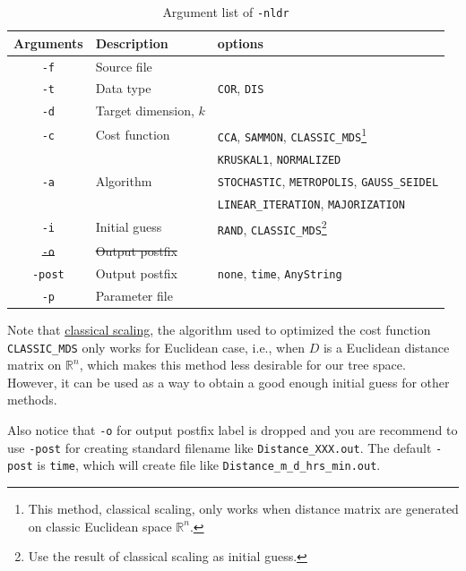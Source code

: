 \documentclass[11pt,a4paper]{article}
\theoremstyle{definition}
\theoremstyle{definition}
\numberwithin{equation}{section}
\begin{document}
	\begin{table}[!h]
		\centering
		\begin{tabular}{cll}
			\hline
			Arguments & Description & options\\
			\hline
			\texttt{-f}& Source file &  \\
			\hline
			\texttt{-t}& Data type & \texttt{COR}, \texttt{DIS}\\
			\hline
			\texttt{-d}& Target dimension, $k$&\\
			\hline
			\texttt{-c}& Cost function& \texttt{CCA}, \texttt{SAMMON}, \texttt{CLASSIC\_MDS}\footnote{This method, classical scaling, only works when distance matrix are generated on classic Euclidean space $\mathbb{R}^n$.}\\
			&&\texttt{KRUSKAL1}, \texttt{NORMALIZED}\\
			\hline
			\texttt{-a}& Algorithm & \texttt{STOCHASTIC}, \texttt{METROPOLIS}, \texttt{GAUSS\_SEIDEL}\\
			&&\texttt{LINEAR\_ITERATION}, \texttt{MAJORIZATION}\\
			\hline
			\texttt{-i}& Initial guess & \texttt{RAND}, \texttt{CLASSIC\_MDS}\footnote{Use the result of classical scaling as initial guess.}\\
			\hline
			\texttt{\st{-o}}& \st{Output postfix}&\\
			\hline
			\texttt{-post} & Output postfix&\texttt{none}, \texttt{time}, \texttt{AnyString}\\
			\hline
			\texttt{-p}& Parameter file&\\
			\hline
		\end{tabular}
		\caption{Argument list of \texttt{-nldr}}
		\label{tab:nldrlist}
	\end{table}

	Note that \href{https://en.wikipedia.org/wiki/Multidimensional_scaling}{classical scaling}, the algorithm used to optimized the cost function \texttt{CLASSIC\_MDS} only works for Euclidean case, i.e., when $D$ is a Euclidean distance matrix on $\mathbb{R}^n$, which makes this method less desirable for our tree space. However, it can be used as a way to obtain a good enough initial guess for other methods. 
	
	Also notice that \texttt{-o} for output postfix label is dropped and you are recommend to use \texttt{-post} for creating standard filename like \texttt{Distance\_XXX.out}. The default \texttt{-post} is \texttt{time}, which will create file like \texttt{Distance\_m\_d\_hrs\_min.out}.
	
\end{document}
